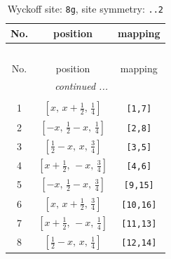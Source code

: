 \documentclass[fleqn,8pt]{jsarticle}
\begin{document}
\begin{longtable}{ccc}
\caption{Wyckoff site: {\tt 8g}, site symmetry: {\tt ..2}}
 \\
 \hline \hline
No. & position & mapping \\ \hline \endfirsthead

\multicolumn{2}{l}{\tablename\ \thetable{}} \\
 \hline \hline
No. & position & mapping \\ \hline \endhead

 \hline \hline
\multicolumn{2}{r}{\footnotesize\it continued ...} \\ \endfoot

 \hline \hline
\multicolumn{2}{r}{} \\ \endlastfoot

1 & $\left[ x,\, x + \frac{1}{2},\, \frac{1}{4} \right]$ & {\tt [1,7]} \\ \hline
2 & $\left[ - x,\, \frac{1}{2} - x,\, \frac{1}{4} \right]$ & {\tt [2,8]} \\ \hline
3 & $\left[ \frac{1}{2} - x,\, x,\, \frac{3}{4} \right]$ & {\tt [3,5]} \\ \hline
4 & $\left[ x + \frac{1}{2},\, - x,\, \frac{3}{4} \right]$ & {\tt [4,6]} \\ \hline
5 & $\left[ - x,\, \frac{1}{2} - x,\, \frac{3}{4} \right]$ & {\tt [9,15]} \\ \hline
6 & $\left[ x,\, x + \frac{1}{2},\, \frac{3}{4} \right]$ & {\tt [10,16]} \\ \hline
7 & $\left[ x + \frac{1}{2},\, - x,\, \frac{1}{4} \right]$ & {\tt [11,13]} \\ \hline
8 & $\left[ \frac{1}{2} - x,\, x,\, \frac{1}{4} \right]$ & {\tt [12,14]} \\
\end{longtable}
\renewcommand{\arraystretch}{1.2}
\end{document}
